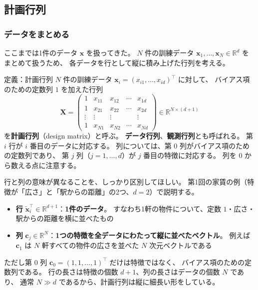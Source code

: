 \subsection{計画行列}

\subsubsection{データをまとめる}

ここまでは1件のデータ $\bm{x}$ を扱ってきた。
$N$ 件の訓練データ $\bm{x}_1, \ldots, \bm{x}_N \in \mathbb{R}^d$ をまとめて扱うため、
各データを行として縦に積み上げた行列を考える。

\begin{itembox}[l]{定義：計画行列}
$N$ 件の訓練データ $\bm{x}_i = (x_{i1}, \ldots, x_{id})^\top$ に対して、
バイアス項のための定数列 $1$ を加えた行列
\begin{equation}
  \bm{X} =
  \begin{pmatrix}
    1 & x_{11} & x_{12} & \cdots & x_{1d} \\
    1 & x_{21} & x_{22} & \cdots & x_{2d} \\
    \vdots & \vdots & \vdots & & \vdots \\
    1 & x_{N1} & x_{N2} & \cdots & x_{Nd}
  \end{pmatrix}
  \in \mathbb{R}^{N \times (d+1)}
\end{equation}
を\textbf{計画行列}（design matrix）と呼ぶ。
\textbf{データ行列}、\textbf{観測行列}とも呼ばれる。
第 $i$ 行が $i$ 番目のデータに対応する。
列については、第 $0$ 列がバイアス項のための定数列であり、
第 $j$ 列（$j = 1, \ldots, d$）が $j$ 番目の特徴に対応する。
列を $0$ から数える点に注意する。
\end{itembox}

行と列の意味が異なることを、しっかり区別してほしい。
第1回の家賃の例（特徴が「広さ」と「駅からの距離」の2つ、$d = 2$）で説明する。
\begin{itemize}
  \item \textbf{行} $\tilde{\bm{x}}_i^\top \in \mathbb{R}^{d+1}$：\textbf{1件のデータ}。
    すなわち1軒の物件について、定数 $1$・広さ・駅からの距離を横に並べたもの
  \item \textbf{列} $\bm{c}_j \in \mathbb{R}^{N}$：\textbf{1つの特徴を全データにわたって縦に並べたベクトル}。
    例えば $\bm{c}_1$ は $N$ 軒すべての物件の広さを並べた $N$ 次元ベクトルである
\end{itemize}
ただし第 $0$ 列 $\bm{c}_0 = (1, 1, \ldots, 1)^\top$ だけは特徴ではなく、
バイアス項のための定数列である。
行の長さは特徴の個数 $d+1$、列の長さはデータの個数 $N$ であり、
通常 $N \gg d$ であるから、計画行列は縦に細長い形をしている。

